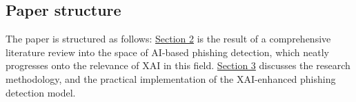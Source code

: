 \subsection*{Paper structure}

The paper is structured as follows: \hyperref[sec:2-literature-review]{Section 2} is the result of a comprehensive literature review into the space of AI-based phishing detection, which neatly progresses onto the relevance of XAI in this field. \hyperref[sec:3-research-methodology]{Section 3} discusses the research methodology, and the practical implementation of the XAI-enhanced phishing detection model.

